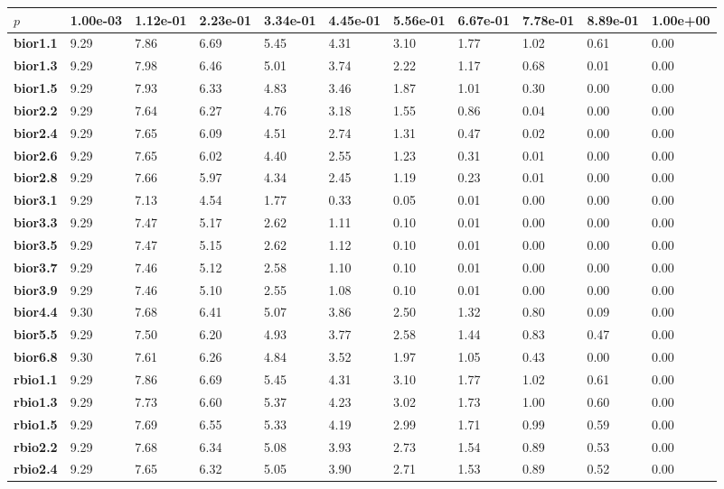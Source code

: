 \begin{tiny}\begin{longtable}{|l|l|l|l|l|l|l|l|l|l|l|}
\hline
$p$&\textbf{1.00e-03}&\textbf{1.12e-01}&\textbf{2.23e-01}&\textbf{3.34e-01}&\textbf{4.45e-01}&\textbf{5.56e-01}&\textbf{6.67e-01}&\textbf{7.78e-01}&\textbf{8.89e-01}&\textbf{1.00e+00}\\\hline
\textbf{bior1.1}&9.29&7.86&6.69&5.45&4.31&3.10&1.77&1.02&0.61&0.00\\\hline
\textbf{bior1.3}&9.29&7.98&6.46&5.01&3.74&2.22&1.17&0.68&0.01&0.00\\\hline
\textbf{bior1.5}&9.29&7.93&6.33&4.83&3.46&1.87&1.01&0.30&0.00&0.00\\\hline
\textbf{bior2.2}&9.29&7.64&6.27&4.76&3.18&1.55&0.86&0.04&0.00&0.00\\\hline
\textbf{bior2.4}&9.29&7.65&6.09&4.51&2.74&1.31&0.47&0.02&0.00&0.00\\\hline
\textbf{bior2.6}&9.29&7.65&6.02&4.40&2.55&1.23&0.31&0.01&0.00&0.00\\\hline
\textbf{bior2.8}&9.29&7.66&5.97&4.34&2.45&1.19&0.23&0.01&0.00&0.00\\\hline
\textbf{bior3.1}&9.29&7.13&4.54&1.77&0.33&0.05&0.01&0.00&0.00&0.00\\\hline
\textbf{bior3.3}&9.29&7.47&5.17&2.62&1.11&0.10&0.01&0.00&0.00&0.00\\\hline
\textbf{bior3.5}&9.29&7.47&5.15&2.62&1.12&0.10&0.01&0.00&0.00&0.00\\\hline
\textbf{bior3.7}&9.29&7.46&5.12&2.58&1.10&0.10&0.01&0.00&0.00&0.00\\\hline
\textbf{bior3.9}&9.29&7.46&5.10&2.55&1.08&0.10&0.01&0.00&0.00&0.00\\\hline
\textbf{bior4.4}&9.30&7.68&6.41&5.07&3.86&2.50&1.32&0.80&0.09&0.00\\\hline
\textbf{bior5.5}&9.29&7.50&6.20&4.93&3.77&2.58&1.44&0.83&0.47&0.00\\\hline
\textbf{bior6.8}&9.30&7.61&6.26&4.84&3.52&1.97&1.05&0.43&0.00&0.00\\\hline
\textbf{rbio1.1}&9.29&7.86&6.69&5.45&4.31&3.10&1.77&1.02&0.61&0.00\\\hline
\textbf{rbio1.3}&9.29&7.73&6.60&5.37&4.23&3.02&1.73&1.00&0.60&0.00\\\hline
\textbf{rbio1.5}&9.29&7.69&6.55&5.33&4.19&2.99&1.71&0.99&0.59&0.00\\\hline
\textbf{rbio2.2}&9.29&7.68&6.34&5.08&3.93&2.73&1.54&0.89&0.53&0.00\\\hline
\textbf{rbio2.4}&9.29&7.65&6.32&5.05&3.90&2.71&1.53&0.89&0.52&0.00\\\hline

\end{longtable}
\end{tiny}
